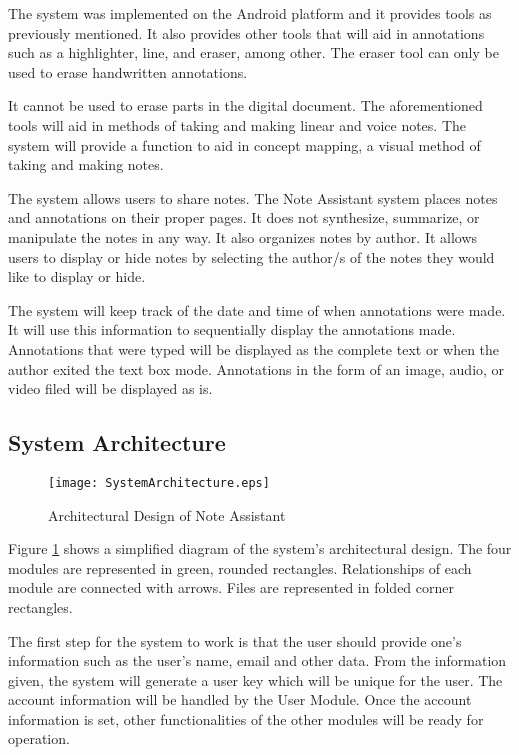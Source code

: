 The system was implemented on the Android platform and it provides tools as previously mentioned. It also provides other tools that will aid in annotations such as a highlighter, line, and eraser, among other. The eraser tool can only be used to erase handwritten annotations. 

It cannot be used to erase parts in the digital document. The aforementioned tools will aid in methods of taking and making linear and voice notes. The system will provide a function to aid in concept mapping, a visual method of taking and making notes.

The system allows users to share notes. The Note Assistant system places notes and annotations on their proper pages. It does not synthesize, summarize, or manipulate the notes in any way. It also organizes notes by author. It allows users to display or hide notes by selecting the author/s of the notes they would like to display or hide.

The system will keep track of the date and time of when annotations were made. It will use this information to sequentially display the annotations made. Annotations that were typed will be displayed as the complete text or when the author exited the text box mode. Annotations in the form of an image, audio, or video filed will be displayed as is. 

\subsection{System Architecture}
\label{sec:systemarchitecture}

\begin{figure}[htbp!] 
   \centering
   \texttt{[image: SystemArchitecture.eps]}
   \caption{Architectural Design of Note Assistant}
   \label{fig:systemarchitecture}
\end{figure}

Figure \ref{fig:systemarchitecture} shows a simplified diagram of the system's architectural design. The four modules are represented in green, rounded rectangles. Relationships of each module are connected with arrows. Files are represented in folded corner rectangles.

\pagebreak

The first step for the system to work is that the user should provide one's information such as the user's name, email and other data. From the information given, the system will generate a user key which will be unique for the user. The account information will be handled by the User Module. Once the account information is set, other functionalities of the other modules will be ready for operation.

